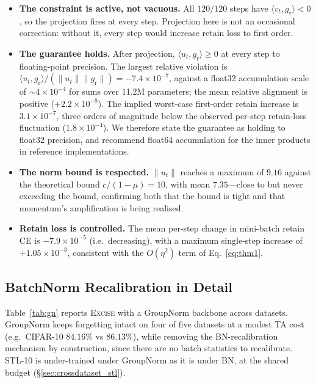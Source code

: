 \documentclass{article}
\newcommand{\ours}{\textsc{Excise}}
\newcommand{\gr}{g_{\mathrm{r}}}
\theoremstyle{remark}
\theoremstyle{plain}
\begin{document}
\begin{itemize}
\item \textbf{The constraint is active, not vacuous.} All $120/120$ steps have
$\langle v_t,\gr\rangle < 0$, so the projection fires at every step. Projection
here is not an occasional correction: without it, every step would increase
retain loss to first order.
\item \textbf{The guarantee holds.} After projection,
$\langle u_t,\gr\rangle \ge 0$ at every step to floating-point precision. The
largest relative violation is
$\langle u_t,\gr\rangle/(\|u_t\|\|\gr\|) = -7.4\times 10^{-7}$, against a
float32 accumulation scale of ${\sim}4\times 10^{-4}$ for sums over 11.2M
parameters; the mean relative alignment is positive
($+2.2\times 10^{-8}$). The implied worst-case first-order retain increase is
$3.1\times 10^{-7}$, three orders of magnitude below the observed per-step
retain-loss fluctuation ($1.8\times 10^{-4}$). We therefore state the guarantee
as holding to float32 precision, and recommend float64 accumulation for the
inner products in reference implementations.
\item \textbf{The norm bound is respected.} $\|u_t\|$ reaches a maximum of
$9.16$ against the theoretical bound $c/(1-\mu)=10$, with mean $7.35$---close to
but never exceeding the bound, confirming both that the bound is tight and that
momentum's amplification is being realised.
\item \textbf{Retain loss is controlled.} The mean per-step change in mini-batch
retain CE is $-7.9\times 10^{-5}$ (i.e.\ decreasing), with a maximum single-step
increase of $+1.05\times 10^{-3}$, consistent with the $O(\eta^2)$ term of
Eq.~\ref{eq:thm1}.
\end{itemize}

\subsection{BatchNorm Recalibration in Detail}\label{app:bn}

Table~\ref{tab:gn} reports \ours{} with a GroupNorm backbone across datasets.
GroupNorm keeps forgetting intact on four of five datasets at a modest TA cost
(e.g.\ CIFAR-10 $84.16\%$ vs $86.13\%$), while removing the BN-recalibration
mechanism by construction, since there are no batch statistics to recalibrate.
STL-10 is under-trained under GroupNorm as it is under BN, at the shared budget
(\S\ref{sec:crossdataset_stl}).
\end{document}

